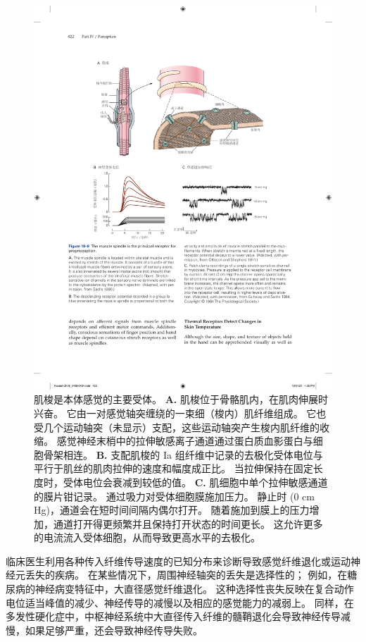 \begin{figure}[htbp]
	\centering
	\includegraphics[width=1.0\linewidth]{chap18/fig_18_9}
	\caption{肌梭是本体感觉的主要受体。
		\textbf{A.} 肌梭位于骨骼肌内，在肌肉伸展时兴奋。
		它由一对感觉轴突缠绕的一束细（梭内）肌纤维组成。
		它也受几个运动轴突（未显示）支配，这些运动轴突产生梭内肌纤维的收缩。
		感觉神经末梢中的拉伸敏感离子通道通过蛋白质血影蛋白与细胞骨架相连\cite{sachs1992stretch}。
		\textbf{B.} 支配肌梭的 Ia 组纤维中记录的去极化受体电位与平行于肌丝的肌肉拉伸的速度和幅度成正比。 
		当拉伸保持在固定长度时，受体电位会衰减到较低的值\cite{cone1971transducer}。
		\textbf{C.} 肌细胞中单个拉伸敏感通道的膜片钳记录。
		通过吸力对受体细胞膜施加压力。
		静止时 (0 cm Hg)，通道会在短时间间隔内偶尔打开。 
		随着施加到膜上的压力增加，通道打开得更频繁并且保持打开状态的时间更长。
		这允许更多的电流流入受体细胞，从而导致更高水平的去极化\cite{guharay1984stretch}。}
	\label{fig:18_9}
\end{figure}


临床医生利用各种传入纤维传导速度的已知分布来诊断导致感觉纤维退化或运动神经元丢失的疾病。
在某些情况下，周围神经轴突的丢失是选择性的；
例如，在糖尿病的神经病变特征中，大直径感觉纤维退化。
这种选择性丧失反映在复合动作电位适当峰值的减少、神经传导的减慢以及相应的感觉能力的减弱上。
同样，在多发性硬化症中，中枢神经系统中大直径传入纤维的髓鞘退化会导致神经传导减慢，如果足够严重，还会导致神经传导失败。



